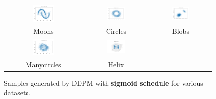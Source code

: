 \documentclass[11pt]{article}
\begin{document}
\begin{figure}[H]
    \centering
    \begin{tabular}{ccc}
        \includegraphics[width=0.3\textwidth]{exps/ddpm_2_200_sigmoid_moons/samples_200.png} &
        \includegraphics[width=0.3\textwidth]{exps/ddpm_2_200_sigmoid_circles/samples_200.png} &
        \includegraphics[width=0.3\textwidth]{exps/ddpm_2_200_sigmoid_blobs/samples_200.png} \\
        Moons & Circles & Blobs \\[0.5em]
        
        \includegraphics[width=0.3\textwidth]{exps/ddpm_2_200_sigmoid_manycircles/samples_200.png} &
        \includegraphics[width=0.3\textwidth]{exps/ddpm_3_200_sigmoid_helix/samples_200.png} & \\
        Manycircles & Helix & \\
    \end{tabular}
    \caption{Samples generated by DDPM with \textbf{sigmoid schedule} for various datasets.}
    \label{fig:sigmoid_schedule}
\end{figure}
\end{document}
